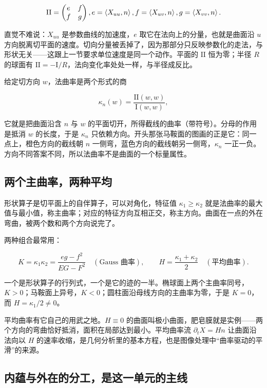 \[
\mathrm{II}=\begin{pmatrix}e&f\\f&g\end{pmatrix},
\space
e=\left\langle X_{uu},n\right\rangle,\space
f=\left\langle X_{uv},n\right\rangle,\space
g=\left\langle X_{vv},n\right\rangle.
\]

直觉不难说：\(X_{uu}\) 是参数曲线的加速度，\(e\) 取它在法向上的分量，也就是曲面沿 \(u\) 方向脱离切平面的速度。切向分量被丢掉了，因为那部分只反映参数化的走法，与形状无关——这跟上一节要求单位速度是同一个动作。平面的 \(\mathrm{II}\) 恒为零；半径 \(R\) 的球面有 \(\mathrm{II}=-\mathrm{I}/R\)，法向变化率处处一样，与半径成反比。

给定切方向 \(w\)，法曲率是两个形式的商

\[
\kappa_{n}(w)=\frac{\mathrm{II}(w,w)}{\mathrm{I}(w,w)},
\]

它就是把曲面沿含 \(n\) 与 \(w\) 的平面切开，所得截线的曲率（带符号）。分母的作用是抵消 \(w\) 的长度，于是 \(\kappa_{n}\) 只依赖方向。开头那张马鞍面的图画的正是它：同一点上，橙色方向的截线朝 \(n\) 一侧弯，蓝色方向的截线朝另一侧弯，\(\kappa_{n}\) 一正一负。方向不同答案不同，所以法曲率不是曲面的一个标量属性。

\subsection{两个主曲率，两种平均}

形状算子是切平面上的自伴算子，可以对角化，特征值 \(\kappa_{1}\ge\kappa_{2}\) 就是法曲率的最大值与最小值，称主曲率；对应的特征方向互相正交，称主方向。曲面在一点的外在弯曲，被两个数和两个方向说完了。

两种组合最常用：

\[
K=\kappa_{1}\kappa_{2}=\frac{eg-f^{2}}{EG-F^{2}}\quad(\text{Gauss 曲率}),
\qquad
H=\frac{\kappa_{1}+\kappa_{2}}{2}\quad(\text{平均曲率}).
\]

一个是形状算子的行列式，一个是它的迹的一半。椭球面上两个主曲率同号，\(K>0\)；马鞍面上异号，\(K<0\)；圆柱面沿母线方向的主曲率为零，于是 \(K=0\)，而 \(H=\kappa_{1}/2\neq0\)。

平均曲率有它自己的用武之地。\(H\equiv0\) 的曲面叫极小曲面，肥皂膜就是实例——两个方向的弯曲恰好抵消，面积在局部达到最小。平均曲率流 \(\partial_{t}X=Hn\) 让曲面沿法向以 \(H\) 的速率收缩，是几何分析里的基本方程，也是图像处理中``曲率驱动的平滑''的来源。

\subsection{内蕴与外在的分工，是这一单元的主线}

